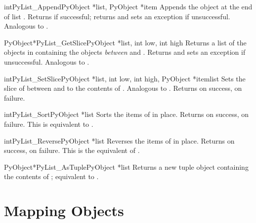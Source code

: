 \begin{cfuncdesc}{int}{PyList_Append}{PyObject *list, PyObject *item}
  Appends the object  at the end of list .
  Returns  if successful; returns  and sets an
  exception if unsuccessful.  Analogous to
  .
\end{cfuncdesc}

\begin{cfuncdesc}{PyObject*}{PyList_GetSlice}{PyObject *list,
                                              int low, int high}
  Returns a list of the objects in  containing the objects
  \emph{between}  and .  Returns \NULL{} and sets
  an exception if unsuccessful.
  Analogous to .
\end{cfuncdesc}

\begin{cfuncdesc}{int}{PyList_SetSlice}{PyObject *list,
                                        int low, int high,
                                        PyObject *itemlist}
  Sets the slice of  between  and  to the
  contents of .  Analogous to
  .  Returns
   on success,  on failure.
\end{cfuncdesc}

\begin{cfuncdesc}{int}{PyList_Sort}{PyObject *list}
  Sorts the items of  in place.  Returns  on
  success,  on failure.  This is equivalent to
  .
\end{cfuncdesc}

\begin{cfuncdesc}{int}{PyList_Reverse}{PyObject *list}
  Reverses the items of  in place.  Returns  on
  success,  on failure.  This is the equivalent of
  .
\end{cfuncdesc}

\begin{cfuncdesc}{PyObject*}{PyList_AsTuple}{PyObject *list}
  Returns a new tuple object containing the contents of ;
  equivalent to .
\end{cfuncdesc}


\section{Mapping Objects \label{mapObjects}}

